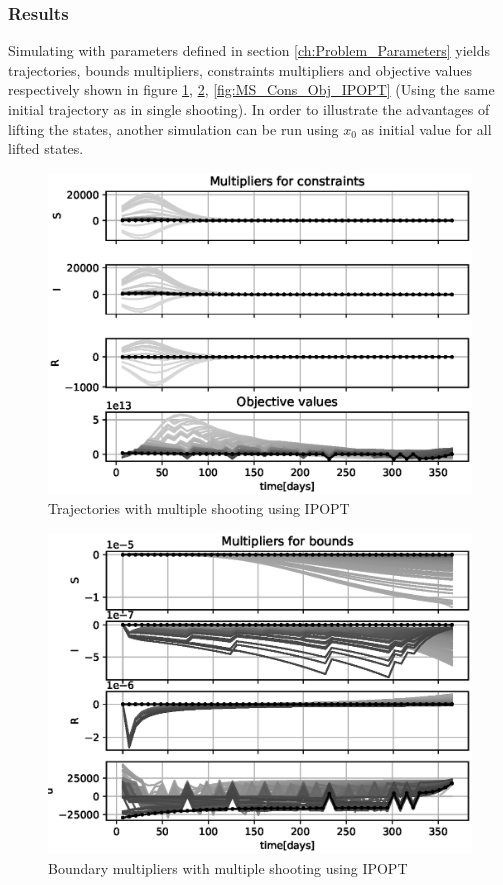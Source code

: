 \subsubsection{Results}
Simulating with parameters defined in section \ref{ch:Problem_Parameters} yields trajectories, bounds multipliers, constraints multipliers and objective values respectively shown in figure \ref{fig:MS_Traj_SD_IPOPT}, \ref{fig:MS_Bounds_SD_IPOPT}, \ref{fig:MS_Cons_Obj_IPOPT} (Using the same initial trajectory as in single shooting). In order to illustrate the advantages of lifting the states, another simulation can be run using $x_0$ as initial value for all lifted states.

\begin{figure}[H]
    \centering
    \includegraphics[width=.8\textwidth]{pythonProject/Figures/Multiple_Shooting_obj_con_IPOPT_traj_initial_Social_Distancing.eps}
    \caption{Trajectories with multiple shooting using IPOPT}
    \label{fig:MS_Traj_SD_IPOPT}
\end{figure}

\begin{figure}[H]
    \centering
    \includegraphics[width=.8\textwidth]{pythonProject/Figures/Multiple_Shooting_bounds_IPOPT_traj_initial_Social_Distancing.eps}
    \caption{Boundary multipliers with multiple shooting using IPOPT}
    \label{fig:MS_Bounds_SD_IPOPT}
\end{figure}


